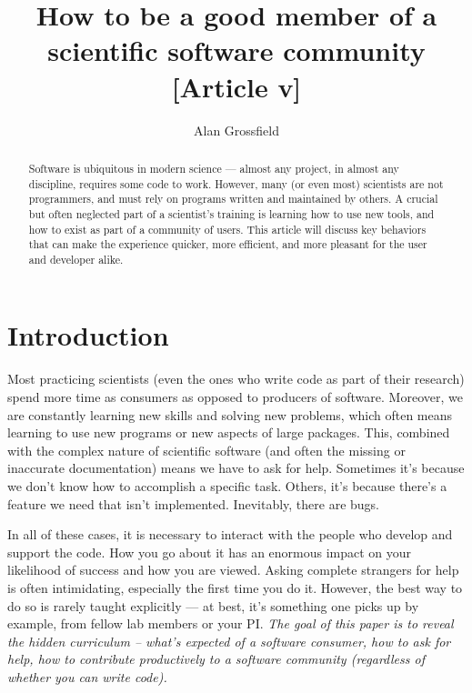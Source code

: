 \documentclass[9pt,training]{livecoms}
\title{How to be a good member of a scientific software community [Article v\versionnumber]}
\author[1*]{Alan Grossfield}
\affil[1]{University of Rochester Medical Center, Department of Biochemistry and Biophysics}
\begin{document}
\begin{frontmatter}
\maketitle

\begin{abstract}

Software is ubiquitous in modern science --- almost any project, in almost any
discipline, requires some code to work. However, many (or even most) scientists
are not programmers, and must rely on programs written and maintained by others.
A crucial but often neglected part of a scientist's training is
learning how to use new tools, and how to exist as part of a community of users.
This article will discuss key behaviors that can make the experience quicker,
more efficient, and more pleasant for the user and developer alike.


\end{abstract}

\end{frontmatter}




\section{Introduction}

Most practicing scientists (even the ones who write code as part of their
research) spend more time as consumers as opposed to producers of software.
Moreover, we are constantly learning new skills and solving new problems, which
often means learning to use new programs or new aspects of large packages. This,
combined with the complex nature of scientific software (and often the missing
or inaccurate documentation) means we have to ask for help.  Sometimes it's
because we don't know how to accomplish a specific task. Others, it's because
there's a feature we need that isn't implemented. Inevitably, there are bugs.

In all of these cases, it is necessary to interact with the people who develop
and support the code. How you go about it has an enormous impact on your
likelihood of success and how you are viewed. Asking complete strangers for help
is often intimidating, especially the first time you do it. However, the best
way to do so is rarely taught explicitly --- at best, it's something one picks
up by example, from fellow lab members or your PI.  \emph{The goal of this
paper is to reveal the hidden curriculum -- what's expected of a software
consumer, how to ask for help, how to contribute productively to a software
community (regardless of whether you can write code).}
\end{document}
